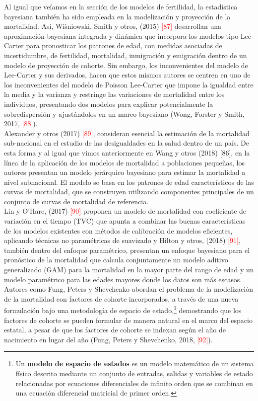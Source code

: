Al igual que veíamos en la sección de los modelos de fertilidad, la estadística bayesiana también ha sido empleada en la modelización y proyección de la mortalidad. As\'i, Wi\`sniowski, Smith y otros, (2015) \textcolor{red}{[87]} desarrollan una aproximación bayesiana integrada y dinámica que incorpora los modelos tipo Lee-Carter para pronosticar los patrones de edad, con medidas asociadas de incertidumbre, de fertilidad, mortalidad, inmigración y emigración dentro de un modelo de proyección de cohorte. Sin embargo, los inconvenientes del modelo de Lee-Carter y sus derivados, hacen que estos mismos autores se centren en uno de los inconvenientes del modelo de Poisson Lee-Carter que impone la igualdad entre la media y la varianza y restringe las variaciones de mortalidad entre los individuos, presentando dos modelos para explicar potencialmente la sobredispersión y ajustándolos en un marco bayesiano (Wong, Forster y Smith, 2017, \textcolor{red}{[88]}).\\

Alexander y otros (2017) \textcolor{red}{[89]}, consideran esencial la estimación de la mortalidad sub-nacional en el estudio de las desigualdades en la salud dentro de un país. De esta forma y al igual que vimos anteriormente en Wang y otros (2018) \textcolor{black}{[86]}, en la línea de la aplicación de los modelos de mortalidad a poblaciones pequeñas, los autores presentan un modelo jerárquico bayesiano para estimar la mortalidad a nivel subnacional. El modelo se basa en los patrones de edad característicos de las curvas de mortalidad, que se construyen utilizando componentes principales de un conjunto de curvas de mortalidad de referencia.\\ 

Lin y O'Hare, (2017) \textcolor{red}{[90]} proponen un modelo de mortalidad con coeficiente de variación en el tiempo (TVC) que apunta a combinar las buenas características de los modelos existentes con métodos de calibración de modelos eficientes, aplicando técnicas no paramétricas de suavizado y Hilton y otros, (2018) \textcolor{red}{[91]}, también dentro del enfoque paramétrico, presentan un enfoque bayesiano para el pronóstico de la mortalidad que calcula conjuntamente un modelo aditivo generalizado (GAM) para la mortalidad en la mayor parte del rango de edad y un modelo paramétrico para las edades mayores donde los datos son más escasos.\\

Autores como Fung, Peters y Shevchenko abordan el problema de la modelización de la mortalidad con factores de cohorte incorporados, a través de una nueva formulación bajo una metodología de espacio de estado,\footnote{Un \textbf{modelo de espacio de estados} es un modelo matemático de un sistema físico descrito mediante un conjunto de entradas, salidas y variables de estado relacionadas por ecuaciones diferenciales de infinito orden que se combinan en una ecuación diferencial matricial de primer orden.} demostrando que los factores de cohorte se pueden formular de manera natural en el marco del espacio estatal, a pesar de que los factores de cohorte se indexan según el año de nacimiento en lugar del año (Fung, Peters y Shevchenko, 2018, \textcolor{red}{[92]}).\\ 

